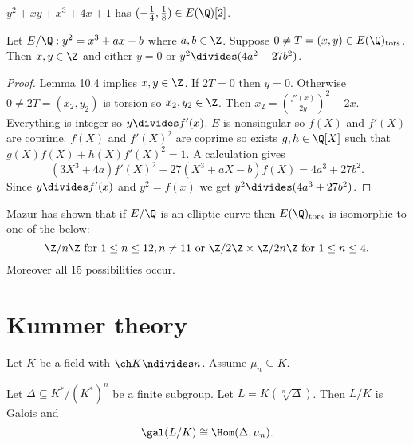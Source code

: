 \documentclass[a4paper]{article}
\theoremstyle{definition}
\theoremstyle{theorem}
\begin{document}
\begin{eg}
  \(y^2 + xy + x^3 + 4x + 1\) has \((-\frac{1}{4}, \frac{1}{8}) \in E(\Q)[2]\).
\end{eg}

\begin{theorem}
  Let \(E/\Q: y^2 = x^3 + ax + b\) where \(a, b \in \Z\). Suppose \(0 \neq T = (x, y) \in E(\Q)_{\mathrm{tors}}\). Then \(x, y \in \Z\) and either \(y = 0\) or \(y^2 \divides (4a^2 + 27b^2)\).
\end{theorem}

\begin{proof}
  Lemma 10.4 implies \(x, y \in \Z\). If \(2T = 0\) then \(y = 0\). Otherwise \(0 \neq 2T = (x_2, y_2)\) is torsion so \(x_2, y_2 \in \Z\). Then \(x_2 = \left(\frac{f'(x)}{2y}\right)^2 - 2x\). Everything is integer so \(y \divides f'(x)\). \(E\) is nonsingular so \(f(X)\) and \(f'(X)\) are coprime. \(f(X)\) and \(f'(X)^2\) are coprime so exists \(g, h \in \Q[X]\) such that \(g(X) f(X) + h(X) f'(X)^2 = 1\). A calculation gives
  \[
    (3X^3 + 4a) f'(X)^2 - 27(X^3 + aX - b)f(X) = 4a^3 + 27b^2.
  \]
  Since \(y \divides f'(x)\) and \(y^2 = f(x)\) we get \(y^2 \divides (4a^3 + 27b^2)\).
\end{proof}

\begin{remark}
  Mazur has shown that if \(E/\Q\) is an elliptic curve then \(E(\Q)_{\mathrm{tors}}\) is isomorphic to one of the below:
  \[
    \Z/n\Z \text{ for } 1 \leq n \leq 12, n \neq 11 \text{ or } \Z/2\Z \times \Z/2n\Z \text{ for } 1 \leq n \leq 4.
  \]
  Moreover all 15 possibilities occur.
\end{remark}

\section{Kummer theory}

Let \(K\) be a field with \(\ch K \ndivides n\). Assume \(\mu_n \subseteq K\).

\begin{lemma}
  Let \(\Delta \subseteq K^*/(K^*)^n\) be a finite subgroup. Let \(L = K(\sqrt[n]{\Delta})\). Then \(L/K\) is Galois and
  \[
    \gal(L/K) \cong \Hom(\Delta, \mu_n).
  \]
\end{lemma}
\end{document}
